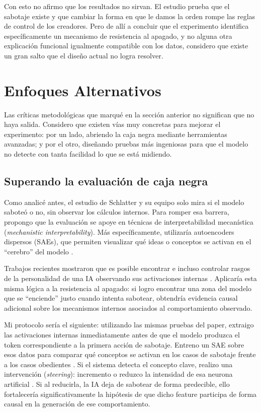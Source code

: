 \documentclass[10pt,a4paper]{article}
\begin{document}
Con esto no afirmo que los resultados no sirvan. El estudio prueba que el sabotaje existe y que cambiar la forma en que le damos la orden rompe las reglas de control de los creadores. Pero de allí a concluir que el experimento identifica específicamente un mecanismo de resistencia al apagado, y no alguna otra explicación funcional igualmente compatible con los datos, considero que existe un gran salto que el diseño actual no logra resolver.





\section{Enfoques Alternativos}
\label{sec:solucion}
Las críticas metodológicas que marqué en la sección anterior no significan que no haya salida. Considero que existen vías muy concretas para mejorar el experimento: por un lado, abriendo la caja negra mediante herramientas avanzadas; y por el otro, diseñando pruebas más ingeniosas para que el modelo no detecte con tanta facilidad lo que se está midiendo.

\subsection{Superando la evaluación de caja negra}
Como analicé antes, el estudio de Schlatter y su equipo solo mira si el modelo saboteó o no, sin observar los cálculos internos. Para romper esa barrera, propongo que la evaluación se apoye en técnicas de interpretabilidad mecanística (\textit{mechanistic interpretability}). Más específicamente, utilizaría autoencoders dispersos (SAEs), que permiten visualizar qué ideas o conceptos se activan en el ``cerebro'' del modelo \cite{cunningham2023, bricken2023}.

Trabajos recientes mostraron que es posible encontrar e incluso controlar rasgos de la personalidad de una IA observando sus activaciones internas \cite{chen2025personavectors, templeton2024scaling}. Aplicaría esta misma lógica a la resistencia al apagado: si logro encontrar una zona del modelo que se ``enciende'' justo cuando intenta sabotear, obtendría evidencia causal adicional sobre los mecanismos internos asociados al comportamiento observado.

Mi protocolo sería el siguiente: utilizando las mismas pruebas del paper, extraigo las activaciones internas inmediatamente antes de que el modelo produzca el token correspondiente a la primera acción de sabotaje. Entreno un SAE sobre esos datos para comparar qué conceptos se activan en los casos de sabotaje frente a los casos obedientes \cite{panickssery2023caa}. Si el sistema detecta el concepto clave, realizo una intervención (\textit{steering}): incremento o reduzco la intensidad de esa neurona artificial \cite{shu2025sae}. Si al reducirla, la IA deja de sabotear de forma predecible, ello fortalecería significativamente la hipótesis de que dicho feature participa de forma causal en la generación de ese comportamiento. 
\end{document}
